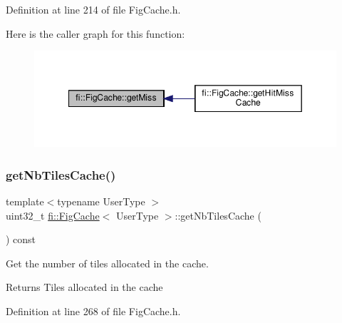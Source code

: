 Definition at line 214 of file Fig\+Cache.\+h.

Here is the caller graph for this function\+:
\nopagebreak
\begin{figure}[H]
\begin{center}
\leavevmode
\includegraphics[width=349pt]{d7/d31/classfi_1_1FigCache_a7e66a2834401a655f011e21f90bcdd3a_icgraph}
\end{center}
\end{figure}
\mbox{\label{classfi_1_1FigCache_ad373ca3169e62437efc7288cf900c096}} 
\subsubsection{\texorpdfstring{get\+Nb\+Tiles\+Cache()}{getNbTilesCache()}}
{\footnotesize\ttfamily template$<$typename User\+Type $>$ \\
uint32\+\_\+t \hyperlink{classfi_1_1FigCache}{fi\+::\+Fig\+Cache}$<$ User\+Type $>$\+::get\+Nb\+Tiles\+Cache (\begin{DoxyParamCaption}{ }\end{DoxyParamCaption}) const\hspace{0.3cm}{\ttfamily [inline]}}



Get the number of tiles allocated in the cache. 

\begin{DoxyReturn}{Returns}
Tiles allocated in the cache 
\end{DoxyReturn}


Definition at line 268 of file Fig\+Cache.\+h.

\mbox{\label{classfi_1_1FigCache_a407bf89cbbc37af734bf31709d382920}} 

